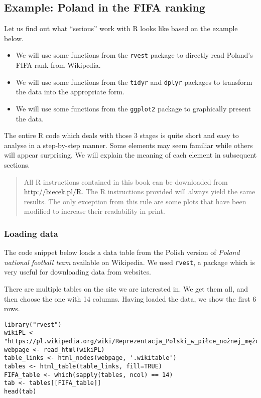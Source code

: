 \documentclass[]{book}
\theoremstyle{definition}
\theoremstyle{definition}
\theoremstyle{definition}
\theoremstyle{remark}
\begin{document}
\hypertarget{part_121}{\subsection{Example: Poland in the FIFA
ranking}\label{part_121}}

Let us find out what ``serious'' work with R looks like based on the
example below.

\begin{itemize}
\item
  We will use some functions from the \texttt{rvest} package to directly
  read Poland's FIFA rank from Wikipedia.
\item
  We will use some functions from the \texttt{tidyr} and \texttt{dplyr}
  packages to transform the data into the appropriate form.
\item
  We will use some functions from the \texttt{ggplot2} package to
  graphically present the data.
\end{itemize}

The entire R code which deals with those 3 stages is quite short and
easy to analyse in a step-by-step manner. Some elements may seem
familiar while others will appear surprising. We will explain the
meaning of each element in subsequent sections.

\begin{quote}
All R instructions contained in this book can be downloaded from
\url{http://biecek.pl/R}. The R instructions provided will always yield
the same results. The only exception from this rule are some plots that
have been modified to increase their readability in print.
\end{quote}

\subsubsection{Loading data}\label{part_1211}

The code snippet below loads a data table from the Polish version of
\emph{Poland national football team} available on Wikipedia. We used
\texttt{rvest}, a package which is very useful for downloading data from
websites.

There are multiple tables on the site we are interested in. We get them
all, and then choose the one with 14 columns. Having loaded the data, we
show the first 6 rows.

\begin{verbatim}
library("rvest")
wikiPL <- "https://pl.wikipedia.org/wiki/Reprezentacja_Polski_w_piłce_nożnej_mężczyzn"
webpage <- read_html(wikiPL)
table_links <- html_nodes(webpage, '.wikitable')
tables <- html_table(table_links, fill=TRUE)
FIFA_table <- which(sapply(tables, ncol) == 14)
tab <- tables[[FIFA_table]]
head(tab)
\end{verbatim}
\end{document}

